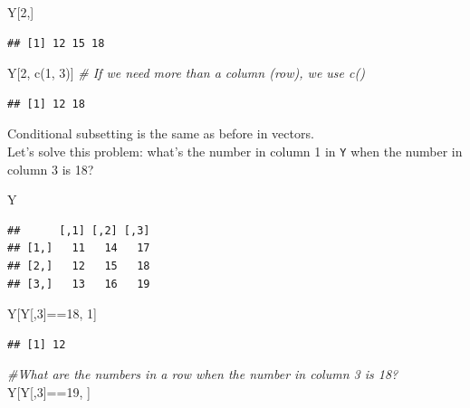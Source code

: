 \documentclass[
]{book}
\newenvironment{Shaded}{\begin{snugshade}}{\end{snugshade}}
\newcommand{\CommentTok}[1]{\textcolor[rgb]{0.56,0.35,0.01}{\textit{#1}}}
\newcommand{\DecValTok}[1]{\textcolor[rgb]{0.00,0.00,0.81}{#1}}
\newcommand{\FunctionTok}[1]{\textcolor[rgb]{0.00,0.00,0.00}{#1}}
\newcommand{\NormalTok}[1]{#1}
\newcommand{\SpecialCharTok}[1]{\textcolor[rgb]{0.00,0.00,0.00}{#1}}
\theoremstyle{definition}
\theoremstyle{definition}
\theoremstyle{definition}
\theoremstyle{definition}
\theoremstyle{remark}
\begin{document}
\begin{Shaded}
\begin{Highlighting}[]
\NormalTok{Y[}\DecValTok{2}\NormalTok{,]}
\end{Highlighting}
\end{Shaded}

\begin{verbatim}
## [1] 12 15 18
\end{verbatim}

\begin{Shaded}
\begin{Highlighting}[]
\NormalTok{Y[}\DecValTok{2}\NormalTok{, }\FunctionTok{c}\NormalTok{(}\DecValTok{1}\NormalTok{, }\DecValTok{3}\NormalTok{)] }\CommentTok{\# If we need more than a column (row), we use c()}
\end{Highlighting}
\end{Shaded}

\begin{verbatim}
## [1] 12 18
\end{verbatim}

Conditional subsetting is the same as before in vectors.\\
Let's solve this problem: what's the number in column 1 in \texttt{Y} when the number in column 3 is 18?

\begin{Shaded}
\begin{Highlighting}[]
\NormalTok{Y}
\end{Highlighting}
\end{Shaded}

\begin{verbatim}
##      [,1] [,2] [,3]
## [1,]   11   14   17
## [2,]   12   15   18
## [3,]   13   16   19
\end{verbatim}

\begin{Shaded}
\begin{Highlighting}[]
\NormalTok{Y[Y[,}\DecValTok{3}\NormalTok{]}\SpecialCharTok{==}\DecValTok{18}\NormalTok{, }\DecValTok{1}\NormalTok{]}
\end{Highlighting}
\end{Shaded}

\begin{verbatim}
## [1] 12
\end{verbatim}

\begin{Shaded}
\begin{Highlighting}[]
\CommentTok{\#What are the numbers in a row when the number in column 3 is 18?}
\NormalTok{Y[Y[,}\DecValTok{3}\NormalTok{]}\SpecialCharTok{==}\DecValTok{19}\NormalTok{, ]}
\end{Highlighting}
\end{Shaded}
\end{document}
